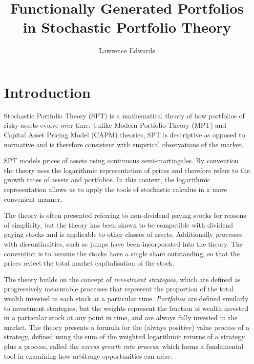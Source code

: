 \documentclass[british]{amsart} \usepackage{lmodern}
\numberwithin{equation}{section} \numberwithin{figure}{section}
\theoremstyle{plain} \newtheorem{thm}{\protect\theoremname}[section]
\theoremstyle{definition} \newtheorem{defn}[thm]{\protect\definitionname}
\theoremstyle{plain} \newtheorem{assumption}[thm]{\protect\assumptionname}
\theoremstyle{plain} \newtheorem{lem}[thm]{\protect\lemmaname}
\theoremstyle{plain} \newtheorem{prop}[thm]{\protect\propositionname}
\theoremstyle{remark} \newtheorem{rem}[thm]{\protect\remarkname}
\theoremstyle{plain} \newtheorem{cor}[thm]{\protect\corollaryname}
\begin{document}
\title{Functionally Generated Portfolios in Stochastic Portfolio Theory}
\author{Lawrence Edwards} \maketitle

\newpage

\tableofcontents{}

\newpage


\section{Introduction}

Stochastic Portfolio Theory (SPT) is a mathematical theory of how portfolios of
risky assets evolve over time. Unlike Modern Portfolio Theory (MPT) and Capital
Asset Pricing Model (CAPM) theories, SPT is descriptive as opposed to normative
and is therefore consistent with empirical observations of the market.

SPT models prices of assets using continuous semi-martingales. By convention the
theory uses the logarithmic representation of prices and therefore refers to the
growth rates of assets and portfolios. In this context, the logarithmic
representation allows us to apply the tools of stochastic calculus in a more
convenient manner. 

The theory is often presented referring to non-dividend paying stocks for
reasons of simplicity, but the theory has been shown to be compatible with
dividend paying stocks and is applicable to other classes of assets.
Additionally processes with discontinuities, such as jumps have been
incorporated into the theory. The convention is to assume the stocks have a
single share outstanding, so that the prices reflect the total market
capitalisation of the stock.

The theory builds on the concept of \textit{investment strategies}, which are
defined as progressively measurable processes that represent the proportion of
the total wealth invested in each stock at a particular time.
\textit{Portfolios} are defined similarly to investment strategies, but 
the weights represent the fraction of wealth invested in a particular stock at
any point in time, and are always fully invested in the market. The theory
presents a formula for the (always positive) value process of a strategy,
defined using the sum of the weighted logarithmic returns of a strategy plus a
process, called the \textit{excess growth rate process}, which forms a
fundamental tool in examining how arbitrage opportunities can arise.
\end{document}
